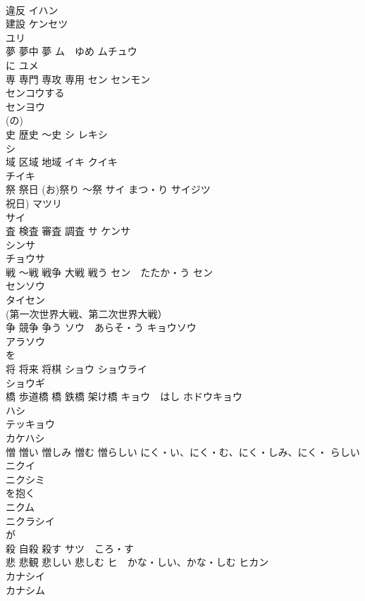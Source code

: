 \documentclass[8pt]{extreport}
\begin{document}
\begin{CJK}{UTF8}{min}
\\	違反	イハン 
\\	建設	ケンセツ 
\\	ユリ	
\\	夢 夢中 夢	ム　ゆめ ムチュウ 
\\	に ユメ 
\\	専 専門 専攻 専用	セン センモン
\\	センコウする 
\\	センヨウ
\\	(の)
\\	史 歴史 〜史	シ レキシ 
\\	シ 
\\	域 区域 地域	イキ クイキ 
\\	チイキ 
\\	祭 祭日 (お)祭り 〜祭	サイ まつ・り サイジツ 
\\	祝日) マツリ 
\\	サイ 
\\	査 検査 審査 調査	サ ケンサ 
\\	シンサ 
\\	チョウサ 
\\	戦 〜戦 戦争 大戦 戦う	セン　たたか・う セン 
\\	センソウ 
\\	タイセン 
\\	(第一次世界大戦、第二次世界大戦）
\\	争 競争 争う	ソウ　あらそ・う キョウソウ　
\\	アラソウ 
\\	を
\\	将 将来 将棋	ショウ ショウライ 
\\	ショウギ 
\\	橋 歩道橋 橋 鉄橋 架け橋	キョウ　はし ホドウキョウ 
\\	ハシ 
\\	テッキョウ 
\\	カケハシ 
\\	憎 憎い 憎しみ 憎む 憎らしい	にく・い、にく・む、にく・しみ、にく・ らしい ニクイ 
\\	ニクシミ 
\\	を抱く 
\\	ニクム 
\\	ニクラシイ
\\	が
\\	殺 自殺 殺す	サツ　ころ・す
\\	悲 悲観 悲しい 悲しむ	ヒ　かな・しい、かな・しむ ヒカン 
\\	カナシイ 
\\	カナシム 

\end{CJK}
\end{document}
